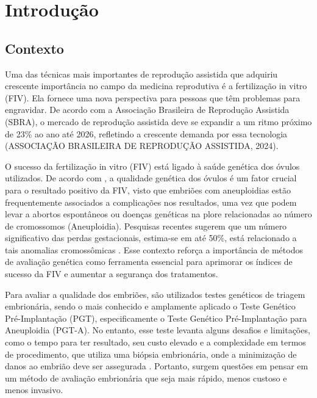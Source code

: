 \chapter[Introdução]{Introdução}

\section{Contexto}

Uma das técnicas mais importantes de reprodução assistida que adquiriu crescente importância no campo da medicina reprodutiva é a fertilização in vitro (FIV). Ela fornece uma nova perspectiva para pessoas que têm problemas para engravidar. De acordo com a Associação Brasileira de Reprodução Assistida (SBRA), o mercado de reprodução assistida deve se expandir a um ritmo próximo de 23\% ao ano até 2026, refletindo a crescente demanda por essa tecnologia (ASSOCIAÇÃO BRASILEIRA DE REPRODUÇÃO ASSISTIDA, 2024).

O sucesso da fertilização in vitro (FIV) está ligado à saúde genética dos óvulos utilizados. De acordo com \cite{ping2023}, a qualidade genética dos óvulos é um fator crucial para o resultado positivo da FIV, visto que embriões com aneuploidias estão frequentemente associados a complicações nos resultados, uma vez que podem levar a abortos espontâneos ou doenças genéticas na plore relacionadas ao número de cromossomos (Aneuploidia). Pesquisas recentes sugerem que um número significativo das perdas gestacionais, estima-se em até 50\%, está relacionado a tais anomalias cromossômicas \cite{scienceofbiogenetics2024}. Esse contexto reforça a importância de métodos de avaliação genética como ferramenta essencial para aprimorar os índices de sucesso da FIV e aumentar a segurança dos tratamentos.

Para avaliar a qualidade dos embriões, são utilizados testes genéticos de triagem embrionária, sendo o mais conhecido e amplamente aplicado o Teste Genético Pré-Implantação (PGT), especificamente o Teste Genético Pré-Implantação para Aneuploidia (PGT-A). No entanto, esse teste levanta alguns desafios e limitações, como o tempo para ter resultado, seu custo elevado e a complexidade em termos de procedimento, que utiliza uma biópsia embrionária, onde a minimização de danos ao embrião deve ser assegurada \cite{yang2024}. Portanto, surgem questões em pensar em um método de avaliação embrionária que seja mais rápido,  menos custoso e menos invasivo. 

